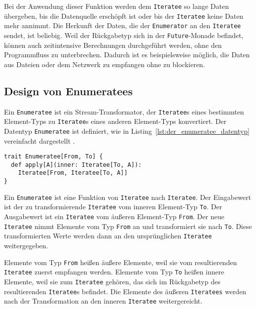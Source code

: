 Bei der Anwendung dieser Funktion werden dem \lstinline|Iteratee| so lange Daten übergeben, bis die Datenquelle erschöpft ist oder bis der \lstinline|Iteratee| keine Daten mehr annimmt.
Die Herkunft der Daten, die der \lstinline|Enumerator| an den \lstinline|Iteratee| sendet, ist beliebig.
Weil der Rückgabetyp sich in der \lstinline|Future|-Monade befindet, können auch zeitintensive Berechnungen durchgeführt werden, ohne den Programmfluss zu unterbrechen.
Dadurch ist es beispielsweise möglich, die Daten aus Dateien oder dem Netzwerk zu empfangen ohne zu blockieren.



\subsection{Design von Enumeratees} %
\label{sub:design_enumeratees}

Ein \lstinline|Enumeratee| ist ein Stream-Transformator, der \lstinline|Iteratee|s eines bestimmten Element-Typs zu \lstinline|Iteratee|s eines anderen Element-Typs konvertiert.
Der Datentyp \lstinline|Enumeratee| ist definiert, wie in Listing~\ref{lst:der_enumeratee_datentyp} vereinfacht dargestellt \cite[vgl.][]{play_enumeratee_source_code}.
\begin{lstlisting}[caption=Der Enumeratee-Datentyp, label=lst:der_enumeratee_datentyp]
trait Enumeratee[From, To] {
  def apply[A](inner: Iteratee[To, A]):
    Iteratee[From, Iteratee[To, A]]
}
\end{lstlisting}

Ein \lstinline|Enumeratee| ist eine Funktion von \lstinline|Iteratee| nach \lstinline|Iteratee|.
Der Eingabewert ist der zu transformierende \lstinline|Iteratee| vom inneren Element-Typ \lstinline|To|.
Der Ausgabewert ist ein \lstinline|Iteratee| vom äußeren Element-Typ \lstinline|From|.
Der neue \lstinline|Iteratee| nimmt Elemente vom Typ \lstinline|From| an und transformiert sie nach \lstinline|To|.
Diese transformierten Werte werden dann an den ursprünglichen \lstinline|Iteratee| weitergegeben.

Elemente vom Typ \lstinline|From| heißen äußere Elemente, weil sie vom resultierenden \lstinline|Iteratee| zuerst empfangen werden.
Elemente vom Typ \lstinline|To| heißen innere Elemente, weil sie zum \lstinline|Iteratee| gehören, das sich im Rückgabetyp des resultierenden \lstinline|Iteratee|s befindet.
Die Elemente des äußeren \lstinline|Iteratees| werden nach der Transformation an den inneren \lstinline|Iteratee| weitergereicht.

